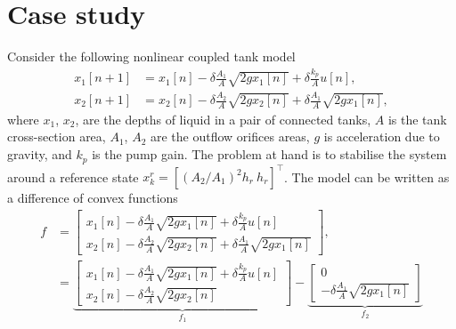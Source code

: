 \documentclass[a4paper, 10 pt, conference]{IEEEconf}
\begin{document}
\section{Case study}
\label{sec:case}
Consider the following nonlinear coupled tank model  
\begin{align*}
x_1[n+1] &= x_1[n] - \delta\frac{A_1}{A} \sqrt{2 g x_1[n]} + \delta\frac{k_p}{A} u[n],
\\
x_2[n+1] &= x_2[n] - \delta\frac{A_2}{A} \sqrt{2 g x_2[n]} + \delta\frac{A_1}{A} \sqrt{2 g x_1[n]}, 
\end{align*}
where $x_1$, $x_2$, are the depths of liquid in a pair of connected tanks, $A$ is the tank cross-section area, $A_1$, $A_2$ are the outflow orifices areas, $g$ is acceleration due to gravity, and $k_p$ is the pump gain. The problem at hand is to stabilise the system around a reference state $x^r_k = [(A_2/A_1)^2h_r \  h_r]^\top$.
%
The model can be written as a difference of convex functions
\begin{align*}
f &= \begin{bmatrix}
     x_1[n] - \delta\frac{A_1}{A} \sqrt{2 g x_1[n]} + \delta\frac{k_p}{A} u[n] \\
      x_2[n] - \delta\frac{A_2}{A} \sqrt{2 g x_2[n]} + \delta\frac{A_1}{A} \sqrt{2 g x_1[n]}
\end{bmatrix}, \\
& = \underbrace{\begin{bmatrix}
     x_1[n] \!-\! \delta\frac{A_1}{A} \sqrt{2 g x_1[n]} \!+\! \delta\frac{k_p}{A} u[n] \\
     x_2[n] \!-\! \delta\frac{A_2}{A} \sqrt{2 g x_2[n]}
\end{bmatrix}}_{f_1} - \underbrace{\begin{bmatrix}
     0 \\
     - \delta\frac{A_1}{A} \sqrt{2 g x_1[n]}
\end{bmatrix}}_{f_2}
\end{align*}
\end{document}
